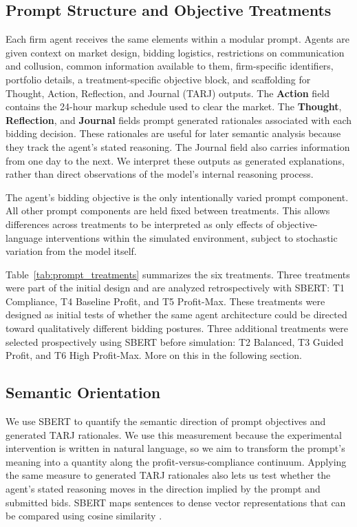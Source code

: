 \subsection{Prompt Structure and Objective Treatments}

Each firm agent receives the same elements within a modular prompt. Agents are given context on market design, bidding logistics, restrictions on communication and collusion, common information available to them, firm-specific identifiers, portfolio details, a treatment-specific objective block, and scaffolding for Thought, Action, Reflection, and Journal (TARJ) outputs. The \textbf{Action} field contains the 24-hour markup schedule used to clear the market. The \textbf{Thought}, \textbf{Reflection}, and \textbf{Journal} fields prompt generated rationales associated with each bidding decision. These rationales are useful for later semantic analysis because they track the agent's stated reasoning. The Journal field also carries information from one day to the next. We interpret these outputs as generated explanations, rather than direct observations of the model's internal reasoning process.

The agent's bidding objective is the only intentionally varied prompt component. All other prompt components are held fixed between treatments. This allows differences across treatments to be interpreted as only effects of objective-language interventions within the simulated environment, subject to stochastic variation from the model itself.

Table~\ref{tab:prompt_treatments} summarizes the six treatments. Three treatments were part of the initial design and are analyzed retrospectively with SBERT: T1 Compliance, T4 Baseline Profit, and T5 Profit-Max. These treatments were designed as initial tests of whether the same agent architecture could be directed toward qualitatively different bidding postures. Three additional treatments were selected prospectively using SBERT before simulation: T2 Balanced, T3 Guided Profit, and T6 High Profit-Max. More on this in the following section.



\subsection{Semantic Orientation}

We use SBERT to quantify the semantic direction of prompt objectives and generated TARJ rationales. We use this measurement because the experimental intervention is written in natural language, so we aim to transform the prompt's meaning into a quantity along the profit-versus-compliance continuum. Applying the same measure to generated TARJ rationales also lets us test whether the agent's stated reasoning moves in the direction implied by the prompt and submitted bids. SBERT maps sentences to dense vector representations that can be compared using cosine similarity \cite{reimers2019sentencebert}. 

